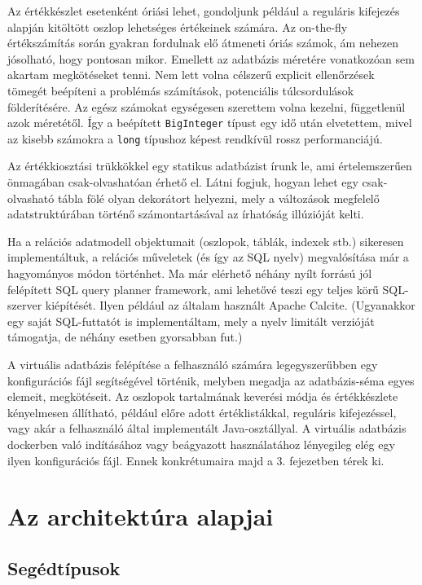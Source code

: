 \documentclass[
    parspace,
    noindent,
    nohyp,
]{elteiktdk}[2023/04/10]
\begin{document}
Az értékkészlet esetenként óriási lehet,
gondoljunk például a reguláris kifejezés alapján kitöltött oszlop lehetséges értékeinek számára.
Az on-the-fly értékszámítás során gyakran fordulnak elő átmeneti óriás számok,
ám nehezen jósolható, hogy pontosan mikor.
Emellett az adatbázis méretére vonatkozóan sem akartam megkötéseket tenni.
Nem lett volna célszerű explicit ellenőrzések tömegét beépíteni
a problémás számítások, potenciális túlcsordulások földerítésére.
Az egész számokat egységesen szerettem volna kezelni, függetlenül azok méretétől.
Így a beépített \texttt{BigInteger} típust egy idő után elvetettem,
mivel az kisebb számokra a \texttt{long} típushoz képest rendkívül rossz performanciájú.

Az értékkiosztási trükkökkel egy statikus adatbázist írunk le,
ami értelemszerűen önmagában csak-olvashatóan érhető el.
Látni fogjuk, hogyan lehet egy csak-olvasható tábla fölé olyan dekorátort helyezni,
mely a változások megfelelő adatstruktúrában történő számontartásával
az írhatóság illúzióját kelti.

Ha a relációs adatmodell objektumait (oszlopok, táblák, indexek stb.) sikeresen implementáltuk,
a relációs műveletek (és így az SQL nyelv) megvalósítása már a hagyományos módon történhet.
Ma már elérhető néhány nyílt forrású jól felépített SQL query planner framework,
ami lehetővé teszi egy teljes körű SQL-szerver kiépítését.
Ilyen például az általam használt Apache Calcite.
(Ugyanakkor egy saját SQL-futtatót is implementáltam,
mely a nyelv limitált verzióját támogatja, de néhány esetben gyorsabban fut.)

A virtuális adatbázis felépítése a felhasználó számára legegyszerűbben
egy konfigurációs fájl segítségével történik,
melyben megadja az adatbázis-séma egyes elemeit, megkötéseit.
Az oszlopok tartalmának keverési módja és értékkészlete kényelmesen állítható,
például előre adott értéklistákkal, reguláris kifejezéssel,
vagy akár a felhasználó által implementált Java-osztállyal.
A virtuális adatbázis dockerben való indításához vagy beágyazott használatához
lényegileg elég egy ilyen konfigurációs fájl.
Ennek konkrétumaira majd a 3. fejezetben térek ki.


\section{Az architektúra alapjai}

\subsection{Segédtípusok}
\end{document}
